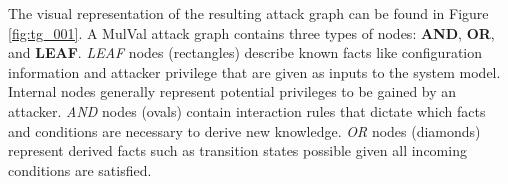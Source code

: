 




 The visual representation of the resulting attack graph can be found in Figure \ref{fig:tg_001}. A MulVal attack graph contains three types of nodes: \textbf{AND}, \textbf{OR}, and \textbf{LEAF}. \textit{LEAF} nodes (rectangles) describe known facts like configuration information and attacker privilege that are given as inputs to the system model. Internal nodes generally represent potential privileges to be gained by an attacker.  \textit{AND} nodes (ovals) contain interaction rules that dictate which facts and conditions are necessary to derive new knowledge. \textit{OR} nodes (diamonds) represent derived facts such as transition states possible given all incoming conditions are satisfied.




